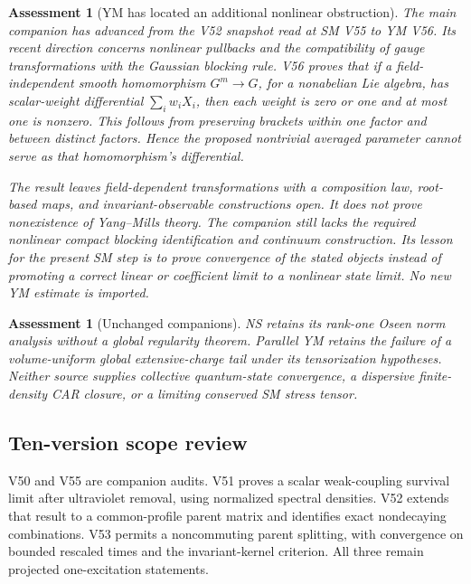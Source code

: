 \documentclass[11pt]{article}
\newtheorem{assessment}[theorem]{Assessment}
\theoremstyle{remark}
\begin{document}
\begin{assessment}[YM has located an additional nonlinear obstruction]
\label{ass:v20v60-ym}
The main companion has advanced from the V52 snapshot read at
SM V55 to YM V56.  Its recent direction concerns nonlinear
pullbacks and the compatibility of gauge transformations
with the Gaussian blocking rule.  V56 proves that if a
field-independent smooth homomorphism \(G^m\to G\), for a
nonabelian Lie algebra, has scalar-weight differential
\(\sum_iw_iX_i\), then each weight is zero or one and at most
one is nonzero.  This follows from preserving brackets
within one factor and between distinct factors.
Hence the proposed nontrivial averaged parameter cannot
serve as that homomorphism's differential.

The result leaves field-dependent transformations with a
composition law, root-based maps, and invariant-observable
constructions open.  It does not prove nonexistence of
Yang--Mills theory.  The companion still lacks the required
nonlinear compact blocking identification and continuum
construction.  Its lesson for the present SM step is to
prove convergence of the stated objects instead of
promoting a correct linear or coefficient limit to a
nonlinear state limit.  No new YM estimate is imported.
\end{assessment}

\begin{assessment}[Unchanged companions]
\label{ass:v20v60-other}
NS retains its rank-one Oseen norm analysis without a
global regularity theorem.  Parallel YM retains the
failure of a volume-uniform global extensive-charge tail
under its tensorization hypotheses.  Neither source
supplies collective quantum-state convergence, a
dispersive finite-density CAR closure, or a limiting
conserved SM stress tensor.
\end{assessment}

\subsection{Ten-version scope review}

V50 and V55 are companion audits.  V51 proves a scalar
weak-coupling survival limit after ultraviolet removal,
using normalized spectral densities.  V52 extends that
result to a common-profile parent matrix and identifies
exact nondecaying combinations.  V53 permits a
noncommuting parent splitting, with convergence on
bounded rescaled times and the invariant-kernel criterion.
All three remain projected one-excitation statements.
\end{document}
